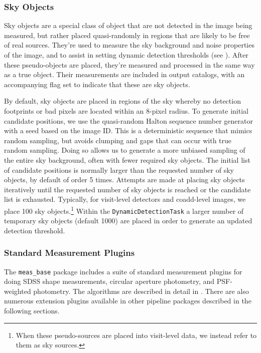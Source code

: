 \subsubsection{Sky Objects}
\label{sec:sky-objects}

Sky objects are a special class of object that are not detected in the image being measured, but rather placed quasi-randomly in regions that are likely to be free of real sources.
They're used to measure the sky background and noise properties of the image, and to assist in setting dynamic detection thresholds (see ).
After these pseudo-objects are placed, they're measured and processed in the same way as a true object.
Their measurements are included in output catalogs, with an accompanying flag set to indicate that these are sky objects.

By default, sky objects are placed in regions of the sky whereby no detection footprints or bad pixels are located within an 8-pixel radius.
To generate initial candidate positions, we use the quasi-random Halton sequence number generator with a seed based on the image ID.
This is a deterministic sequence that mimics random sampling, but avoids clumping and gaps that can occur with true random sampling.
Doing so allows us to generate a more unbiased sampling of the entire sky background, often with fewer required sky objects.
The initial list of candidate positions is normally larger than the requested number of sky objects, by default of order 5 times.
Attempts are made at placing sky objects iteratively until the requested number of sky objects is reached or the candidate list is exhausted.
Typically, for visit-level detectors and coadd-level images, we place 100 sky objects.\footnote{When these pseudo-sources are placed into visit-level data, we instead refer to them as sky sources.}
Within the \texttt{DynamicDetectionTask} a larger number of temporary sky objects (default 1000) are placed in order to generate an updated detection threshold.

\subsubsection{Standard Measurement Plugins}

The \texttt{meas\_base} package includes a suite of standard measurement plugins for doing SDSS shape measurements, circular aperture photometry, and PSF-weighted photometry.
The algorithms are described in detail in \citet{2018PASJ...70S...5B}.
There are also numerous extension plugins available in other pipeline packages described in the following sections.







